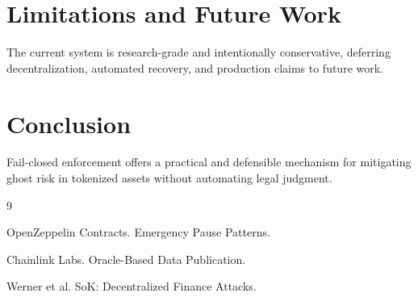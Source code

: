 \documentclass[11pt]{article}
\begin{document}
\section{Limitations and Future Work}
The current system is research-grade and intentionally conservative,
deferring decentralization, automated recovery, and production claims to
future work.

\section{Conclusion}
Fail-closed enforcement offers a practical and defensible mechanism for
mitigating ghost risk in tokenized assets without automating legal judgment.


\begin{thebibliography}{9}

OpenZeppelin Contracts. Emergency Pause Patterns.

Chainlink Labs. Oracle-Based Data Publication.

Werner et al. SoK: Decentralized Finance Attacks.

\end{thebibliography}
\end{document}
